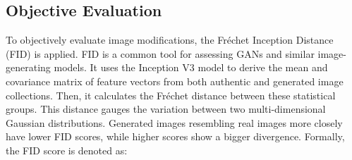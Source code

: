 \begin{spacing}{1.5}
\subsection{Objective Evaluation}
To objectively evaluate image modifications, the Fréchet Inception Distance (FID) is applied. FID is a common tool for assessing GANs and similar image-generating models. It uses the Inception V3\cite{DBLP:conf/cvpr/SzegedyVISW16} model to derive the mean and covariance matrix of feature vectors from both authentic and generated image collections. Then, it calculates the Fréchet distance between these statistical groups. This distance gauges the variation between two multi-dimensional Gaussian distributions. Generated images resembling real images more closely have lower FID scores, while higher scores show a bigger divergence. Formally, the FID score is denoted as:

\end{spacing}

